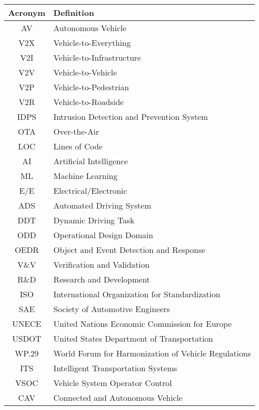 \begin{table}[ht]
    \centering
    \begin{tabular}{|c|l|}
        \hline
        \textbf{Acronym} & \textbf{Definition} \\ \hline
        AV & Autonomous Vehicle \\ \hline
        V2X & Vehicle-to-Everything \\ \hline
        V2I & Vehicle-to-Infrastructure \\ \hline
        V2V & Vehicle-to-Vehicle \\ \hline
        V2P & Vehicle-to-Pedestrian \\ \hline
        V2R & Vehicle-to-Roadside \\ \hline
        IDPS & Intrusion Detection and Prevention System \\ \hline
        OTA & Over-the-Air \\ \hline
        LOC & Lines of Code \\ \hline
        AI & Artificial Intelligence \\ \hline
        ML & Machine Learning \\ \hline
        E/E & Electrical/Electronic \\ \hline
        ADS & Automated Driving System \\ \hline
        DDT & Dynamic Driving Task \\ \hline
        ODD & Operational Design Domain \\ \hline
        OEDR & Object and Event Detection and Response \\ \hline
        V\&V & Verification and Validation \\ \hline
        R\&D & Research and Development \\ \hline
        ISO & International Organization for Standardization \\ \hline
        SAE & Society of Automotive Engineers \\ \hline
        UNECE & United Nations Economic Commission for Europe \\ \hline
        USDOT & United States Department of Transportation \\ \hline
        WP.29 & World Forum for Harmonization of Vehicle Regulations \\ \hline
        ITS & Intelligent Transportation Systems \\ \hline
        VSOC & Vehicle System Operator Control \\ \hline
        CAV & Connected and Autonomous Vehicle \\ \hline

\end{tabular}
\end{table}
